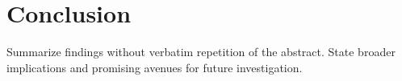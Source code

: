 \section{Conclusion}
\label{sec:conclusion}

Summarize findings without verbatim repetition of the abstract. State broader implications and promising avenues for future investigation.
